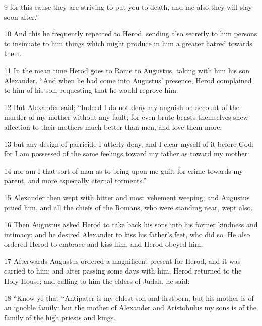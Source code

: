 \par 9 for this cause they are striving to put you to death, and me also they will slay soon after.” 

\par 10 And this he frequently repeated to Herod, sending also secretly to him persons to insinuate to him things which might produce in him a greater hatred towards them. 

\par 11 In the mean time Herod goes to Rome to Augustus, taking with him his son Alexander. “And when he had come into Augustus’ presence, Herod complained to him of his son, requesting that he would reprove him. 

\par 12 But Alexander said; “Indeed I do not deny my anguish on account of the murder of my mother without any fault; for even brute beasts themselves shew affection to their mothers much better than men, and love them more: 

\par 13 but any design of parricide I utterly deny, and I clear myself of it before God: for I am possessed of the same feelings toward my father as toward my mother: 

\par 14 nor am I that sort of man as to bring upon me guilt for crime towards my parent, and more especially eternal torments.” 

\par 15 Alexander then wept with bitter and most vehement weeping; and Augustus pitied him, and all the chiefs of the Romans, who were standing near, wept also. 

\par 16 Then Augustus asked Herod to take back his sons into his former kindness and intimacy: and he desired Alexander to kiss his father’s feet, who did so. He also ordered Herod to embrace and kiss him, and Herod obeyed him. 

\par 17 Afterwards Augustus ordered a magnificent present for Herod, and it was carried to him: and after passing some days with him, Herod returned to the Holy House; and calling to him the elders of Judah, he said: 

\par 18 “Know ye that “Antipater is my eldest son and firstborn, but his mother is of an ignoble family: but the mother of Alexander and Aristobulus my sons is of the family of the high priests and kings. 

